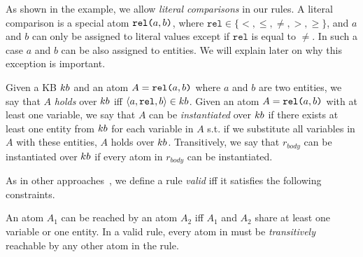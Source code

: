 %
%	

As shown in the example, we allow \emph{literal comparisons} in our rules. A literal comparison is a special atom $\texttt{rel(}a,b\texttt{)}$, where $\texttt{rel} \in \{<,\leq,\neq,>,\geq\}$, and $a$ and $b$ can only be assigned to literal values except if $\texttt{rel}$ is equal to $\neq$. In such a case $a$ and $b$ can be also assigned to entities. We will explain later on why this exception is important.

Given a KB ${\sc kb}$ and an atom $A=\texttt{rel(}a,b\texttt{)}$ where $a$ and $b$ are two entities, we say that $A$ \emph{holds} over ${\sc kb}$ iff $\langle a,\texttt{rel},b\rangle \in {\sc kb}$.
Given %
an atom $A=\texttt{rel(}a,b\texttt{)}$ with at least one variable, we say that $A$ can be \emph{instantiated} over ${\sc kb}$ if there exists at least one entity from ${\sc kb}$ for each variable in $A$ s.t. if we substitute all variables in $A$ with these entities, $A$ holds over ${\sc kb}$. Transitively, %
we say that $r_{body}$ can be instantiated over ${\sc kb}$ if every atom in $r_{body}$ can be instantiated. 

As in other approaches~\cite{galarraga2015fast,Chen:2016}, we define a rule \emph{valid} iff it satisfies the following constraints.

 An atom $A_1$ can be reached by an atom $A_2$ iff $A_1$ and $A_2$ share at least one variable or one entity. 
In a valid rule, every atom in must be \emph{transitively} reachable by any other atom in the rule.

